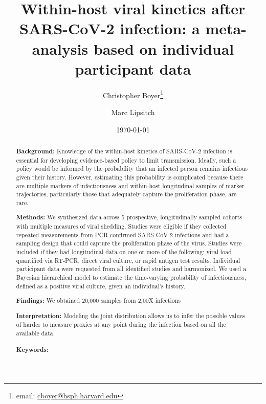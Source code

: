 \documentclass[11pt]{article}
\begin{document}
\begin{titlepage}
\title{Within-host viral kinetics after SARS-CoV-2 infection: a meta-analysis based on individual participant data}
\author[1]{Christopher Boyer\thanks{email: \href{mailto:cboyer@hsph.harvard.edu}{cboyer@hsph.harvard.edu}}}
\author[1,2]{Marc Lipsitch}
\date{\today}
\maketitle
\newpage
\begin{abstract}
\textbf{Background:} 
Knowledge of the within-host kinetics of SARS-CoV-2 infection is essential for developing evidence-based policy to limit transmission. Ideally, such a policy would be informed by the probability that an infected person remains infectious given their history. However, estimating this probability is complicated because there are multiple markers of infectiousness and within-host longitudinal samples of marker trajectories, particularly those that adequately capture the proliferation phase, are rare.

\textbf{Methods:}
We synthesized data across 5 prospective, longitudinally sampled cohorts with multiple measures of viral shedding. Studies were eligible if they collected repeated measurements from PCR-confirmed SARS-CoV-2 infections and had a sampling design that could capture the proliferation phase of the virus. Studies were included if they had longitudinal data on one or more of the following: viral load quantified via RT-PCR, direct viral culture, or rapid antigen test results. Individual participant data were requested from all identified studies and harmonized. We used a Bayesian hierarchical model to estimate the time-varying probability of infectiousness, defined as a positive viral culture, given an individual's history. 

\textbf{Findings:}
We obtained 20,000 samples from 2,00X infections 

\textbf{Interpretation:}
Modeling the joint distribution allows us to infer the possible values of harder to measure proxies at any point during the infection based on all the available data. 
\noindent \\
\vspace{0in} \\
\noindent\textbf{Keywords:} 
\bigskip
\end{abstract}
\setcounter{page}{0}
\thispagestyle{empty}
\end{titlepage}
\pagebreak \newpage
\end{document}

